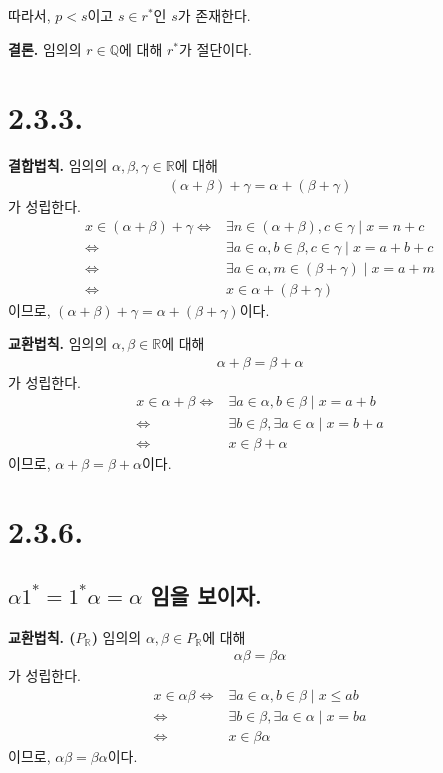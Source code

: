 \documentclass{article}
\begin{document}
따라서, $p<s$이고 $s \in r^*$인 $s$가 존재한다.

\textbf{결론.} 임의의 $r \in \mathbb{Q}$에 대해 $r^*$가 절단이다.

\section{2.3.3.}
\textbf{결합법칙.} 임의의 $\alpha, \beta, \gamma \in \mathbb{R}$에 대해
\begin{align*}
(\alpha + \beta) + \gamma = \alpha + (\beta + \gamma)
\end{align*}가 성립한다. 
\begin{align*}
x \in (\alpha + \beta) + \gamma \iff& \exists n \in (\alpha + \beta), c \in \gamma \mid x = n + c
\\ \iff& \exists a \in \alpha, b \in \beta, c \in \gamma \mid x = a + b + c
\\ \iff& \exists a \in \alpha, m \in (\beta + \gamma) \mid x = a + m
\\ \iff& x \in \alpha + (\beta + \gamma)
\end{align*}이므로, $(\alpha + \beta) + \gamma = \alpha + (\beta + \gamma)$이다.

\textbf{교환법칙.} 임의의 $\alpha, \beta \in \mathbb{R}$에 대해
\begin{align*}
\alpha + \beta = \beta + \alpha
\end{align*}가 성립한다. 
\begin{align*}
x \in \alpha + \beta \iff& \exists a \in \alpha, b \in \beta \mid x = a + b
\\ \iff&  \exists b \in \beta, \exists a \in \alpha \mid x = b + a
\\ \iff& x \in \beta + \alpha
\end{align*}이므로, $\alpha + \beta = \beta + \alpha$이다.

\section{2.3.6.}
\subsection{$\alpha 1^* = 1^* \alpha = \alpha$ 임을 보이자.}
\textbf{교환법칙. ($P_{\mathbb{R}}$)} 임의의 $\alpha, \beta \in P_{\mathbb{R}}$에 대해
\begin{align*}
\alpha \beta = \beta \alpha
\end{align*}가 성립한다. 
\begin{align*}
x \in \alpha \beta \iff& \exists a \in \alpha, b \in \beta \mid x \le ab
\\ \iff&  \exists b \in \beta, \exists a \in \alpha \mid x = ba
\\ \iff& x \in \beta \alpha
\end{align*}이므로, $\alpha \beta = \beta \alpha$이다.
\end{document}
